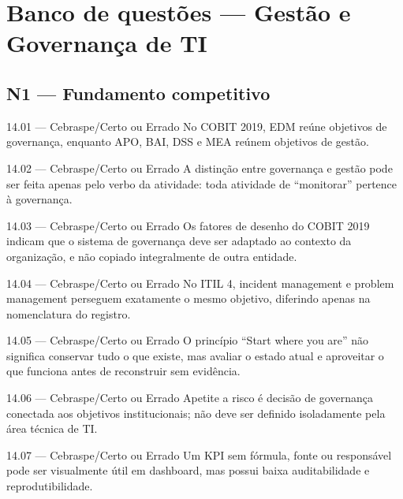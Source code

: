 \section{Banco de questões — Gestão e Governança de TI}

\subsection*{N1 — Fundamento competitivo}

\begin{questao}{ 14.01 — Cebraspe/Certo ou Errado}
No COBIT 2019, EDM reúne objetivos de governança, enquanto APO, BAI, DSS e MEA reúnem objetivos de gestão.
\end{questao}

\begin{questao}{ 14.02 — Cebraspe/Certo ou Errado}
A distinção entre governança e gestão pode ser feita apenas pelo verbo da atividade: toda atividade de ``monitorar'' pertence à governança.
\end{questao}

\begin{questao}{ 14.03 — Cebraspe/Certo ou Errado}
Os fatores de desenho do COBIT 2019 indicam que o sistema de governança deve ser adaptado ao contexto da organização, e não copiado integralmente de outra entidade.
\end{questao}

\begin{questao}{ 14.04 — Cebraspe/Certo ou Errado}
No ITIL 4, incident management e problem management perseguem exatamente o mesmo objetivo, diferindo apenas na nomenclatura do registro.
\end{questao}

\begin{questao}{ 14.05 — Cebraspe/Certo ou Errado}
O princípio ``Start where you are'' não significa conservar tudo o que existe, mas avaliar o estado atual e aproveitar o que funciona antes de reconstruir sem evidência.
\end{questao}

\begin{questao}{ 14.06 — Cebraspe/Certo ou Errado}
Apetite a risco é decisão de governança conectada aos objetivos institucionais; não deve ser definido isoladamente pela área técnica de TI.
\end{questao}

\begin{questao}{ 14.07 — Cebraspe/Certo ou Errado}
Um KPI sem fórmula, fonte ou responsável pode ser visualmente útil em dashboard, mas possui baixa auditabilidade e reprodutibilidade.
\end{questao}


